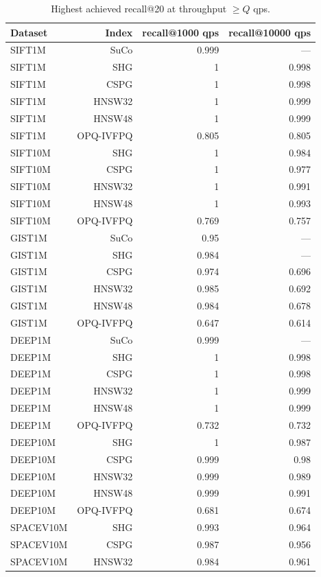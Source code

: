\begin{table}[t]
\centering
\small
\caption{Highest achieved recall@20 at throughput \(\geq Q\) qps.}
\label{tab:recall-at-qps-k20}
\begin{tabular}{lrrr}
\toprule
Dataset & Index & recall@1000 qps & recall@10000 qps \\
\midrule
SIFT1M & SuCo & 0.999 & — \\
SIFT1M & SHG & 1 & 0.998 \\
SIFT1M & CSPG & 1 & 0.998 \\
SIFT1M & HNSW32 & 1 & 0.999 \\
SIFT1M & HNSW48 & 1 & 0.999 \\
SIFT1M & OPQ-IVFPQ & 0.805 & 0.805 \\
SIFT10M & SHG & 1 & 0.984 \\
SIFT10M & CSPG & 1 & 0.977 \\
SIFT10M & HNSW32 & 1 & 0.991 \\
SIFT10M & HNSW48 & 1 & 0.993 \\
SIFT10M & OPQ-IVFPQ & 0.769 & 0.757 \\
GIST1M & SuCo & 0.95 & — \\
GIST1M & SHG & 0.984 & — \\
GIST1M & CSPG & 0.974 & 0.696 \\
GIST1M & HNSW32 & 0.985 & 0.692 \\
GIST1M & HNSW48 & 0.984 & 0.678 \\
GIST1M & OPQ-IVFPQ & 0.647 & 0.614 \\
DEEP1M & SuCo & 0.999 & — \\
DEEP1M & SHG & 1 & 0.998 \\
DEEP1M & CSPG & 1 & 0.998 \\
DEEP1M & HNSW32 & 1 & 0.999 \\
DEEP1M & HNSW48 & 1 & 0.999 \\
DEEP1M & OPQ-IVFPQ & 0.732 & 0.732 \\
DEEP10M & SHG & 1 & 0.987 \\
DEEP10M & CSPG & 0.999 & 0.98 \\
DEEP10M & HNSW32 & 0.999 & 0.989 \\
DEEP10M & HNSW48 & 0.999 & 0.991 \\
DEEP10M & OPQ-IVFPQ & 0.681 & 0.674 \\
SPACEV10M & SHG & 0.993 & 0.964 \\
SPACEV10M & CSPG & 0.987 & 0.956 \\
SPACEV10M & HNSW32 & 0.984 & 0.961 \\

\end{tabular}
\end{table}
